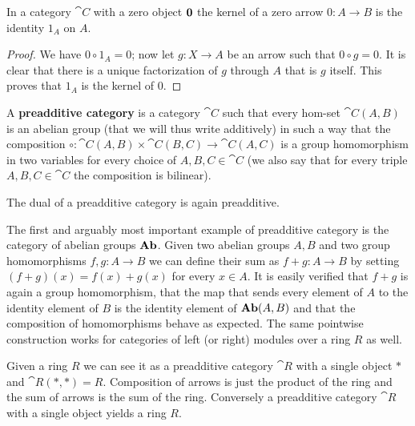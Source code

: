 \begin{proposition}
  \label{prop:kernel_of_zero_arrow}
  In a category \(\cat{C}\) with a zero object \({\bf 0}\) the kernel of a zero arrow \(0\colon A\to B\) is the identity \(1_A\) on \(A\).
\end{proposition}

\begin{proof}
  We have \(0\circ 1_A = 0\); now let \(g\colon X\to A\) be an arrow such that \(0\circ g = 0\). It is clear that there is a unique factorization of \(g\) through \(A\) that is \(g\) itself. This proves that \(1_A\) is the kernel of \(0\).
\end{proof}

\begin{definition}
  \label{def:preadditive_category}
  A {\bf preadditive category} is a category \(\cat{C}\) such that every hom-set \(\cat{C}(A, B)\) is an abelian group (that we will thus write additively) in such a way that the composition \(\circ\colon \cat{C}(A, B)\times\cat{C}(B, C)\to\cat{C}(A, C)\) is a group homomorphism in two variables for every choice of \(A,B,C\in\cat{C}\) (we also say that for every triple \(A,B,C\in\cat{C}\) the composition is bilinear).
\end{definition}

\begin{remark}
  \label{remark:dual_of_a_preadditive_category}
  The dual of a preadditive category is again preadditive.
\end{remark}

\begin{example}
  \label{ex:preadditive_category}
  The first and arguably most important example of preadditive category is the category of abelian groups \(\text{\normalfont\textbf{Ab}}\). Given two abelian groups \(A,B\) and two group homomorphisms \(f,g\colon A\to B\) we can define their sum as \(f + g\colon A\to B\) by setting \((f+g)(x) = f(x) + g(x)\) for every \(x\in A\). It is easily verified that \(f+g\) is again a group homomorphism, that the map that sends every element of \(A\) to the identity element of \(B\) is the identity element of \(\text{\normalfont\textbf{Ab}}(A, B)\) and that the composition of homomorphisms behave as expected. The same pointwise construction works for categories of left (or right) modules over a ring \(R\) as well.
\end{example}

\begin{example}
  \label{ex:ring_preadditive}
  Given a ring \(R\) we can see it as a preadditive category \(\cat{R}\) with a single object \(*\) and \(\cat{R}(*,*)=R\). Composition of arrows is just the product of the ring and the sum of arrows is the sum of the ring. Conversely a preadditive category \(\cat{R}\) with a single object yields a ring \(R\).
\end{example}

